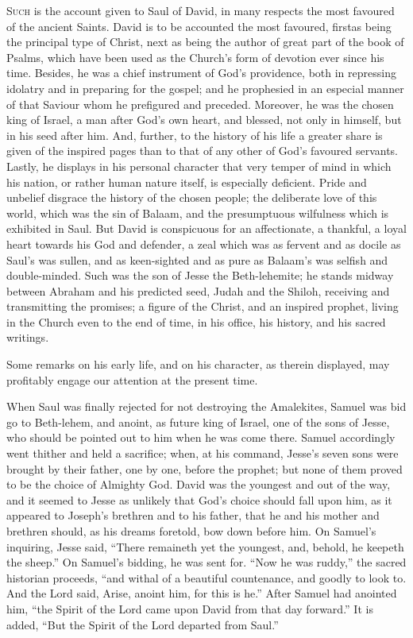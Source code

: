 S\textsc{uch} is the account given to Saul of David, in many respects the
most favoured of the ancient Saints. David is to be accounted the most
favoured, first\emph{}as being the principal type of Christ, next as
being the author of great part of the book of Psalms, which have been
used as the Church's form of devotion ever since his time. Besides, he
was a chief instrument of God's providence, both in repressing
idolatry and in preparing for the gospel; and he prophesied in an
especial manner of that Saviour whom he prefigured and preceded.
Moreover, he was the chosen king of Israel, a man after God's own
heart, and blessed, not only in himself, but in his seed after him.
And, further, to the history of his life a greater share is given of
the inspired pages than to that of any other of God's favoured
servants. Lastly, he displays in his personal character that very
temper of mind in which his nation, or rather human nature itself, is
especially deficient. Pride and unbelief disgrace the history of the
chosen people; the deliberate love of this world, which was the sin of
Balaam, and the presumptuous wilfulness which is exhibited in Saul.
But David is conspicuous for an affectionate, a thankful, a loyal
heart towards his God and defender, a zeal which was as fervent and as
docile as Saul's was sullen, and as keen-sighted and as pure as
Balaam's was selfish and double-minded. Such was the son of Jesse the
Beth-lehemite; he stands midway between Abraham and his predicted
seed, Judah and the Shiloh, receiving and transmitting the promises; a
figure of the Christ, and an inspired prophet, living in the Church
even to the end of time, in his office, his history, and his sacred
writings.

Some remarks on his early life, and on his character, as therein
displayed, may profitably engage our attention at the present time.

When Saul was finally rejected for not destroying the Amalekites,
Samuel was bid go to Beth-lehem, and anoint, as future king of Israel,
one of the sons of Jesse, who should be pointed out to him when he was
come there. Samuel accordingly went thither and held a sacrifice;
when, at his command, Jesse's seven sons were brought by their father,
one by one, before the prophet; but none of them proved to be the
choice of Almighty God. David was the youngest and out of the way, and
it seemed to Jesse as unlikely that God's choice should fall upon him,
as it appeared to Joseph's brethren and to his father, that he and his
mother and brethren should, as his dreams foretold, bow down before
him. On Samuel's inquiring, Jesse said, ``There remaineth yet the
youngest, and, behold, he keepeth the sheep.'' On Samuel's
bidding, he was sent for. ``Now he was ruddy,'' the sacred
historian proceeds, ``and withal of a beautiful countenance, and
goodly to look to. And the Lord said, Arise, anoint him, for this is
he.'' After Samuel had anointed him, ``the Spirit of the Lord
came upon David from that day forward.'' It is added, ``But
the Spirit of the Lord departed from Saul.''

